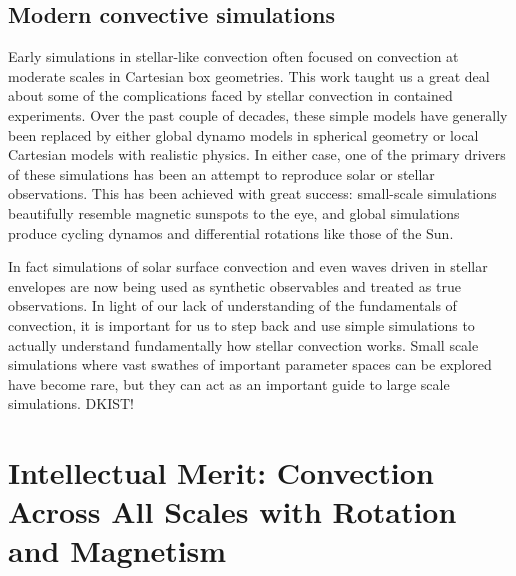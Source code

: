 \documentclass[aasms,12pt]{article}
\begin{document}
\subsection{Modern convective simulations}
Early simulations in stellar-like convection often focused on convection at moderate scales in Cartesian box geometries.
This work taught us a great deal about some of the complications faced by stellar convection in contained experiments.
Over the past couple of decades, these simple models have generally been replaced by either global dynamo models in spherical geometry or local Cartesian models with realistic physics.
In either case, one of the primary drivers of these simulations has been an attempt to reproduce solar or stellar observations.
This has been achieved with great success: small-scale simulations beautifully resemble magnetic sunspots to the eye, and global simulations produce cycling dynamos and differential rotations like those of the Sun.

In fact simulations of solar surface convection and even waves driven in stellar envelopes are now being used as synthetic observables and treated as true observations.
In light of our lack of understanding of the fundamentals of convection, it is important for us to step back and use simple simulations to actually understand fundamentally how stellar convection works.
Small scale simulations where vast swathes of important parameter spaces can be explored have become rare, but they can act as an important guide to large scale simulations.
DKIST!


\section{Intellectual Merit: Convection Across All Scales with Rotation and Magnetism}
\label{sct:thermals}
\end{document}
